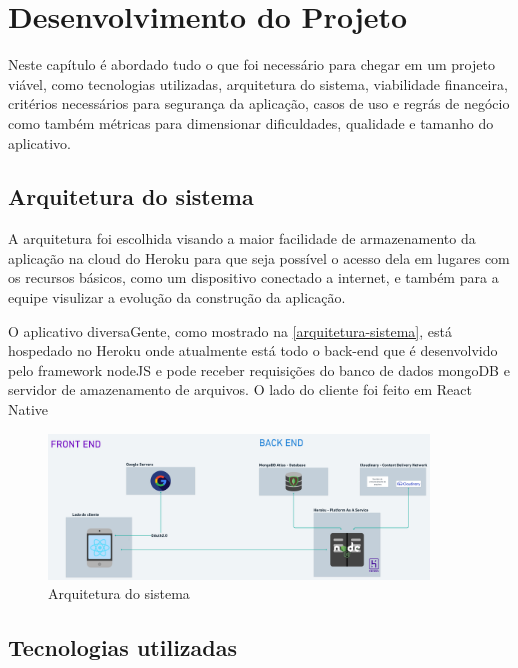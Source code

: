 \chapter{Desenvolvimento do Projeto}

Neste capítulo é abordado tudo o que foi necessário para chegar em um projeto viável, como tecnologias utilizadas, arquitetura do sistema, viabilidade financeira, critérios necessários para segurança da aplicação, casos de uso e regrás de negócio como também métricas para dimensionar dificuldades, qualidade e tamanho do aplicativo.   



\section{Arquitetura do sistema}
A arquitetura foi escolhida visando a maior facilidade de armazenamento da aplicação na cloud do Heroku para que seja possível o acesso dela em lugares com os recursos básicos, como um dispositivo conectado a internet, e também para a equipe visulizar a evolução da construção da aplicação. 

O aplicativo diversaGente, como mostrado na \autoref{arquitetura-sistema}, está hospedado no Heroku onde atualmente está todo o back-end que é desenvolvido pelo framework nodeJS e pode receber requisições do banco de dados mongoDB e servidor de amazenamento de arquivos. O lado do cliente foi feito em React Native 

\begin{figure}[htb]
	\centering
	\caption{\label{fig_arq_virado}Arquitetura do sistema}
	\label{arquitetura-sistema}
	\includegraphics[width=0.9\textwidth]{anexos/poc-arquitetura.png}
\end{figure}


\section{Tecnologias utilizadas}

